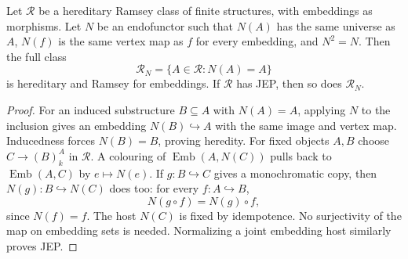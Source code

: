 \begin{lemma}
\label{lem:foundational-ramsey-normalization}
Let $\mathcal R$ be a hereditary Ramsey class of finite structures,
with embeddings as morphisms. Let $N$ be an endofunctor such that
$N(A)$ has the same universe as $A$, $N(f)$ is the same vertex map
as $f$ for every embedding, and $N^2=N$. Then the full class
\[
                  \mathcal R_N=\{A\in\mathcal R:N(A)=A\}
\]
is hereditary and Ramsey for embeddings. If $\mathcal R$ has JEP,
then so does $\mathcal R_N$.
\end{lemma}
\begin{proof}
For an induced substructure $B\subseteq A$ with $N(A)=A$, applying
$N$ to the inclusion gives an embedding $N(B)\hookrightarrow A$
with the same image and vertex map. Inducedness forces $N(B)=B$,
proving heredity. For fixed objects $A,B$ choose
$C\longrightarrow(B)^A_k$ in $\mathcal R$.
A colouring of $\operatorname{Emb}(A,N(C))$ pulls back to
$\operatorname{Emb}(A,C)$ by $e\mapsto N(e)$.
If $g:B\hookrightarrow C$ gives a monochromatic copy, then
$N(g):B\hookrightarrow N(C)$ does too: for every $f:A\hookrightarrow B$,
\[
                       N(g\circ f)=N(g)\circ f,
\]
since $N(f)=f$. The host $N(C)$ is fixed by idempotence.
No surjectivity of the map on embedding sets is needed.
Normalizing a joint embedding host similarly proves JEP.
\end{proof}

